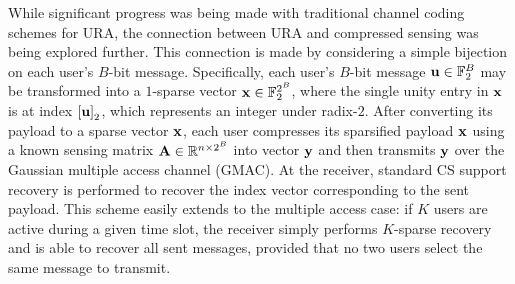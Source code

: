 \documentclass[journal]{IEEEtran}
\begin{document}
While significant progress was being made with traditional channel coding schemes for URA, the connection between URA and compressed sensing was being explored further.
This connection is made by considering a simple bijection on each user's $B$-bit message. 
Specifically, each user's $B$-bit message $\mathbf{u} \in \mathbb{F}_2^B$ may be transformed into a $1$-sparse vector $\mathbf{x} \in \mathbb{F}_2^{2^B}$, where the single unity entry in $\mathbf{x}$ is at index $\left[ \mathbf{u} \right]_{2}$, which represents an integer under radix-$2$. 
After converting its payload to a sparse vector $\mathbf{x}$, each user compresses its sparsified payload $\mathbf{x}$ using a known sensing matrix $\mathbf{A} \in \mathbb{R}^{n \times 2^B}$ into vector $\mathbf{y}$ and then transmits $\mathbf{y}$ over the Gaussian multiple access channel (GMAC). 
At the receiver, standard CS support recovery is performed to recover the index vector corresponding to the sent payload.
This scheme easily extends to the multiple access case: if $K$ users are active during a given time slot, the receiver simply performs $K$-sparse recovery and is able to recover all sent messages, provided that no two users select the same message to transmit. 
\end{document}
